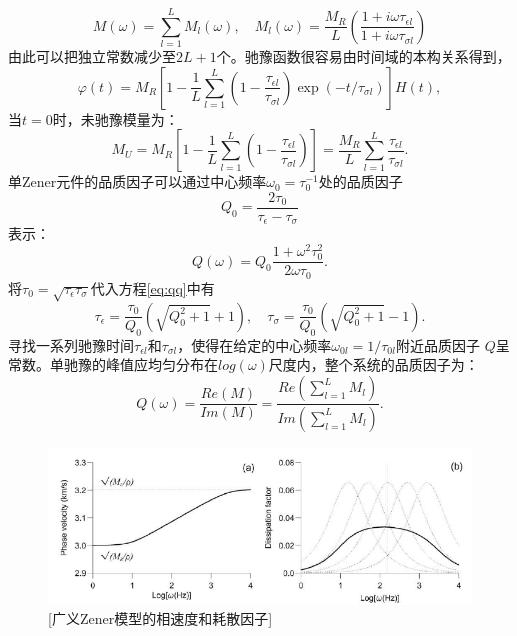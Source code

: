 \begin{equation}
	M(\omega)=\sum_{l=1}^{L}M_l(\omega), \quad M_l(\omega)=\frac{M_R}{L}
	(\frac{1+i\omega\tau_{\epsilon l}}{1+i\omega\tau_{\sigma l}})
\end{equation}
由此可以把独立常数减少至$2L+1$个。驰豫函数很容易由时间域的本构关系得到，
\begin{equation}
	\varphi(t)=M_R[1-\frac{1}{L}\sum_{l=1}^{L}(1-\frac{\tau_{\epsilon l}}{\tau_{\sigma l}})
	\exp(-t/\tau_{\sigma l})]H(t),
\end{equation}
当$t=0$时，未驰豫模量为：
\begin{equation}
	M_U=M_R[1-\frac{1}{L}\sum_{l=1}^{L}(1-\frac{\tau_{\epsilon l}}{\tau_{\sigma l}})]
	=\frac{M_R}{L}\sum_{l=1}^{L}\frac{\tau_{\epsilon l}}{\tau_{\sigma l}}.
\end{equation}
单Zener元件的品质因子可以通过中心频率$\omega_0=\tau_0^{-1}$处的品质因子
\begin{equation}
	Q_0=\frac{2\tau_0}{\tau_\epsilon-\tau_\sigma}
	\label{eq:qq}
\end{equation}
表示：
\begin{equation}
	Q(\omega)=Q_0\frac{1+\omega^2\tau_0^2}{2\omega\tau_0}.
\end{equation}
将$\tau_0=\sqrt{\tau_\epsilon\tau_\sigma}$代入方程\ref{eq:qq}中有
\begin{equation}
	\tau_\epsilon=\frac{\tau_0}{Q_0}(\sqrt{Q_0^2+1}+1), \quad \tau_\sigma=\frac{\tau_0}{Q_0}(\sqrt{Q_0^2+1}-1).
\end{equation}
寻找一系列驰豫时间$\tau_{\epsilon l}$和$\tau_{\sigma l}$，使得在给定的中心频率$\omega_{0l}=1/\tau_{0l}$附近品质因子
$Q$呈常数。单驰豫的峰值应均匀分布在$log(\omega)$尺度内，整个系统的品质因子为：
\begin{equation}
	Q(\omega)=\frac{Re(M)}{Im(M)}=\frac{Re(\sum_{l=1}^{L}M_l)}{Im(\sum_{l=1}^{L}M_l)}.
\end{equation}
\begin{figure}[!htbp]
	    \centering
		\includegraphics[width=0.8\linewidth]{figure/zener_vp}
		[广义Zener模型的相速度和耗散因子]
		\label{fig:zener_vp}
\end{figure}
